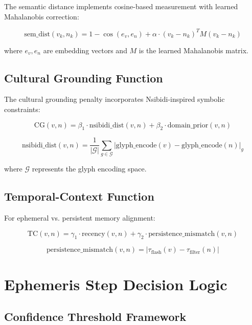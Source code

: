 \documentclass[11pt]{article}
\begin{document}
The semantic distance implements cosine-based measurement with learned Mahalanobis correction:

\begin{equation}
\text{sem\_dist}(v_k, n_k) = 1 - \cos(e_v, e_n) + \alpha \cdot (v_k - n_k)^T M (v_k - n_k)
\end{equation}

where $e_v, e_n$ are embedding vectors and $M$ is the learned Mahalanobis matrix.

\subsection{Cultural Grounding Function}

The cultural grounding penalty incorporates Nsibidi-inspired symbolic constraints:

\begin{equation}
\text{CG}(v,n) = \beta_1 \cdot \text{nsibidi\_dist}(v,n) + \beta_2 \cdot \text{domain\_prior}(v,n)
\end{equation}

\begin{equation}
\text{nsibidi\_dist}(v,n) = \frac{1}{|\mathcal{G}|} \sum_{g \in \mathcal{G}} \left| \text{glyph\_encode}(v) - \text{glyph\_encode}(n) \right|_g
\end{equation}

where $\mathcal{G}$ represents the glyph encoding space.

\subsection{Temporal-Context Function}

For ephemeral vs. persistent memory alignment:

\begin{equation}
\text{TC}(v,n) = \gamma_1 \cdot \text{recency}(v,n) + \gamma_2 \cdot \text{persistence\_mismatch}(v,n)
\end{equation}

\begin{equation}
\text{persistence\_mismatch}(v,n) = \left| \tau_{\text{flash}}(v) - \tau_{\text{filter}}(n) \right|
\end{equation}

\section{Ephemeris Step Decision Logic}

\subsection{Confidence Threshold Framework}
\end{document}
